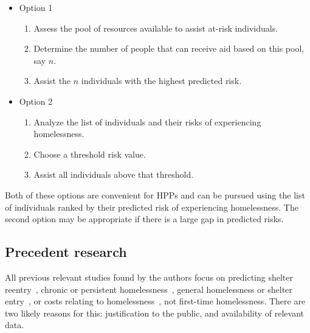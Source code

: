 \documentclass[10pt,letterpaper]{article}
\begin{document}
\begin{itemize}
    \item Option 1
    \begin{enumerate}
        \item Assess the pool of resources available to assist at-risk individuals.
        \item Determine the number of people that can receive aid based on this pool, say $n$.
        \item Assist the $n$ individuals with the highest predicted risk.
    \end{enumerate}
    \item Option 2
    \begin{enumerate}
        \item Analyze the list of individuals and their risks of experiencing homelessness.
        \item Choose a threshold risk value.
        \item Assist all individuals above that threshold.
    \end{enumerate}
\end{itemize}

Both of these options are convenient for HPPs and can be pursued using the list of individuals ranked by their predicted risk of experiencing homelessness. The second option may be appropriate if there is a large gap in predicted risks.

\subsection*{Precedent research}
All previous relevant studies found by the authors focus on predicting shelter reentry~\cite{hong2018applications}, chronic or persistent homelessness~\cite{vanberlo2021interpretable, toros2019early}, general homelessness or shelter entry~\cite{byrne2020classification, shinn2013efficient}, or costs relating to homelessness~\cite{flaming2011crisis}, not first-time homelessness. There are two likely reasons for this: justification to the public, and availability of relevant data.
\end{document}
